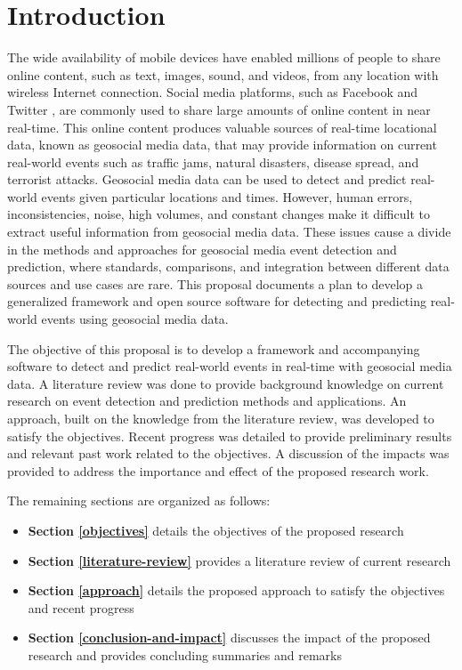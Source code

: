



\section{Introduction} \label{introduction}

The wide availability of mobile devices have enabled millions of people to share online content, such as text, images, sound, and videos, from any location with wireless Internet connection. Social media platforms, such as Facebook \citep{Facebook:2017} and Twitter \citep{Twitter:2017}, are commonly used to share large amounts of online content in near real-time. This online content produces valuable sources of real-time locational data, known as geosocial media data, that may provide information on current real-world events such as traffic jams, natural disasters, disease spread, and terrorist attacks. Geosocial media data can be used to detect and predict real-world events given particular locations and times. However, human errors, inconsistencies, noise, high volumes, and constant changes make it difficult to extract useful information from geosocial media data. These issues cause a divide in the methods and approaches for geosocial media event detection and prediction, where standards, comparisons, and integration between different data sources and use cases are rare. This proposal documents a plan to develop a generalized framework and open source software for detecting and predicting real-world events using geosocial media data.

The objective of this proposal is to develop a framework and accompanying software to detect and predict real-world events in real-time with geosocial media data. A literature review was done to provide background knowledge on current research on event detection and prediction methods and applications. An approach, built on the knowledge from the literature review, was developed to satisfy the objectives. Recent progress was detailed to provide preliminary results and relevant past work related to the objectives. A discussion of the impacts was provided to address the importance and effect of the proposed research work.

The remaining sections are organized as follows:

\begin{itemize}
	\item \textbf{Section \ref{objectives}} details the objectives of the proposed research
	\item \textbf{Section \ref{literature-review}} provides a literature review of current research
	\item \textbf{Section \ref{approach}} details the proposed approach to satisfy the objectives and recent progress
	\item \textbf{Section \ref{conclusion-and-impact}} discusses the impact of the proposed research and provides concluding summaries and remarks
\end{itemize}

